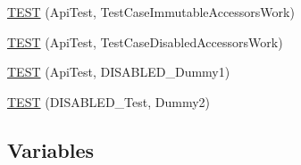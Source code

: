 \begin{DoxyCompactItemize}
\item 
\hyperlink{namespacetesting_1_1internal_a33809333fe5b5f33c2bd56ddcdd1dbb6}{T\+E\+ST} (Api\+Test, Test\+Case\+Immutable\+Accessors\+Work)
\item 
\hyperlink{namespacetesting_1_1internal_a459d693357db8f8f48c26a8bee3ffb84}{T\+E\+ST} (Api\+Test, Test\+Case\+Disabled\+Accessors\+Work)
\item 
\hyperlink{namespacetesting_1_1internal_a9ed5f89c92532506899e3908e79af4de}{T\+E\+ST} (Api\+Test, D\+I\+S\+A\+B\+L\+E\+D\+\_\+\+Dummy1)
\item 
\hyperlink{namespacetesting_1_1internal_a4a84433419426d1c1b87ce998267b0d4}{T\+E\+ST} (D\+I\+S\+A\+B\+L\+E\+D\+\_\+\+Test, Dummy2)
\end{DoxyCompactItemize}
\subsection*{Variables}
